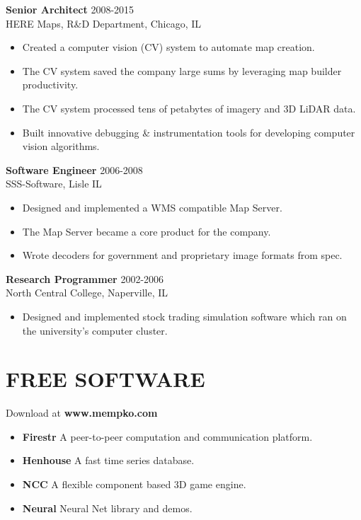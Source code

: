 \documentclass[line,margin]{res}
\begin{document}
\begin{resume}
                {\bf Senior Architect} \hfill 2008-2015 \\
                HERE Maps, 
                R\&D Department, Chicago, IL
                 \begin{itemize}  \itemsep -1pt %
                         \item Created a computer vision (CV)
                        system to automate map creation.
                    \item The CV system saved the company large 
                        sums by leveraging map builder productivity.
                    \item The CV system processed tens of petabytes of imagery and 3D LiDAR data.
                    \item Built innovative debugging \& instrumentation tools 
                        for developing computer vision algorithms.
                \end{itemize}
                {\bf Software Engineer} \hfill  2006-2008 \\
                SSS-Software, Lisle IL
                 \begin{itemize}  \itemsep -1pt 
                    \item Designed and implemented a WMS compatible Map Server.
                    \item The Map Server became a core product for the company.
                    \item Wrote decoders for government and proprietary image formats from spec.  
                 \end{itemize} 
                {\bf Research Programmer} \hfill 2002-2006 \\
                North Central College, Naperville, IL
                \begin{itemize} \itemsep -1pt 
                    \item Designed and implemented stock trading simulation software
                        which ran on the university's computer cluster. 
                \end{itemize} 
\section{FREE SOFTWARE} Download at {\bf www.mempko.com} \\ 
                \begin{itemize} \itemsep -1pt 
                    \item {\bf Firestr} A peer-to-peer computation and communication platform.
                    \item {\bf Henhouse} A fast time series database.
                    \item {\bf NCC} A flexible component based 3D game engine.
                    \item {\bf Neural} Neural Net library and demos.
                \end{itemize}


\end{resume}
\end{document}
